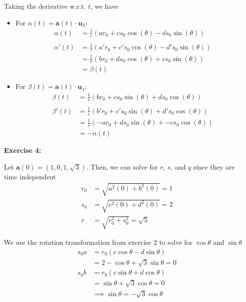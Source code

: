 \documentclass[12pt]{article}
\begin{document}
Taking the derivative w.r.t. $t$, we have
\begin{itemize}
    \item For $\alpha{}(t) = \mathbf{a}(t) \cdot{\mathbf{u}_3}$:
          \begin{align*}
              \alpha{}(t) & = \frac{1}{r}(ar_0 + cs_0\cos(\theta) - ds_0\sin(\theta))    \\\\
              \alpha'(t)  & = \frac{1}{r}(a'r_0 + c's_0\cos(\theta) - d's_0\sin(\theta)) \\
                          & = \frac{1}{r}(br_0 + ds_0\cos(\theta) + cs_0\sin(\theta))    \\
                          & = \beta{}(t)
          \end{align*}
    \item For $\beta{}(t) = \mathbf{a}(t) \cdot{\mathbf{u}_4}$:
          \begin{align*}
              \beta{}(t)  & = \frac{1}{r}(br_0 + cs_0\sin(\theta) + ds_0\cos(\theta))    \\\\
              \beta{}'(t) & = \frac{1}{r}(b'r_0 + c's_0\sin(\theta) + d's_0\cos(\theta)) \\
                          & =\frac{1}{r}(-ar_0 + ds_0\sin(\theta) + -cs_0\cos(\theta))   \\
                          & = -\alpha{}(t)
          \end{align*}
\end{itemize}

\noindent{}\textbf{Exercise 4:}

Let $\mathbf{a}(0) = (1,0,1,\sqrt{3})$.
Then, we can solve for $r$, $s$, and $q$ since they are time independent
\begin{align*}
    r_0 & = \sqrt{a^2(0) + b^2(0)} =  1   \\
    s_0 & = \sqrt{c^2(0) + d^2(0)} = 2    \\
    r   & = \sqrt{r_0^2+s_0^2} = \sqrt{5}
\end{align*}

We use the rotation transformation from exercise 2 to solve for $\cos\theta$ and $\sin\theta$
\begin{align*}
    s_0a & = r_0(c\cos\theta - d\sin\theta)                   \\
         & = 2 - \cos\theta + \sqrt{3}\sin\theta = 0          \\ \tag{1}
    s_0b & = r_0(c\sin\theta + d\cos\theta)                   \\
         & = \sin\theta + \sqrt{3}\cos\theta = 0              \\
         & \implies{\sin\theta = -\sqrt{3}\cos\theta} \tag{2}
\end{align*}
\end{document}
